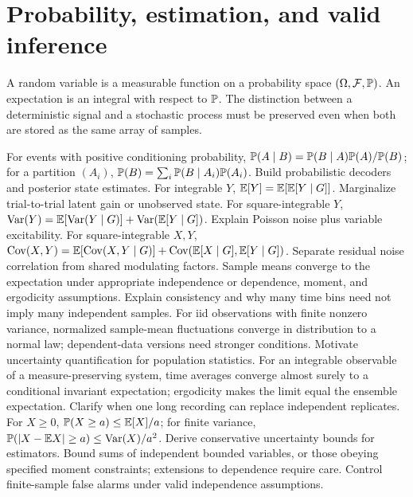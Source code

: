 \chapter{Probability, estimation, and valid inference}
A random variable is a measurable function on a probability space
$(\Omega,\mathcal F,\mathbb{P})$. An expectation is an integral with
respect to $\mathbb{P}$. The distinction between a deterministic
signal and a stochastic process must be preserved even when both are
stored as the same array of samples.

{For events with positive conditioning probability,
$\mathbb{P}(A\mid B)=\mathbb{P}(B\mid A)\mathbb{P}(A)/\mathbb{P}(B)$;
for a partition $(A_i)$, $\mathbb{P}(B)=\sum_i\mathbb{P}(B\mid A_i)\mathbb{P}(A_i)$.}
{Build probabilistic decoders and posterior state estimates.}
{For integrable $Y$, $\mathbb{E}[Y]=\mathbb{E}[\mathbb{E}[Y\mid G]]$.}
{Marginalize trial-to-trial latent gain or unobserved state.}
{For square-integrable $Y$,
$\operatorname{Var}(Y)=\mathbb{E}[\operatorname{Var}(Y\mid G)]+\operatorname{Var}(\mathbb{E}[Y\mid G])$.}
{Explain Poisson noise plus variable excitability.}
{For square-integrable $X,Y$,
$\operatorname{Cov}(X,Y)=\mathbb{E}[\operatorname{Cov}(X,Y\mid G)]
+\operatorname{Cov}(\mathbb{E}[X\mid G],\mathbb{E}[Y\mid G])$.}
{Separate residual noise correlation from shared modulating factors.}
{Sample means converge to the expectation under appropriate
independence or dependence, moment, and ergodicity assumptions.}
{Explain consistency and why many time bins need not imply many independent samples.}
{For iid observations with finite nonzero variance, normalized
sample-mean fluctuations converge in distribution to a normal law;
dependent-data versions need stronger conditions.}
{Motivate uncertainty quantification for population statistics.}
{For an integrable observable of a measure-preserving system,
time averages converge almost surely to a conditional invariant
expectation; ergodicity makes the limit equal the ensemble expectation.}
{Clarify when one long recording can replace independent replicates.}
{For $X\geq0$, $\mathbb{P}(X\geq a)\leq\mathbb{E}[X]/a$;
for finite variance,
$\mathbb{P}(|X-\mathbb{E} X|\geq a)\leq\operatorname{Var}(X)/a^2$.}
{Derive conservative uncertainty bounds for estimators.}
{Bound sums of independent bounded variables, or those obeying
specified moment constraints; extensions to dependence require care.}
{Control finite-sample false alarms under valid independence assumptions.}
